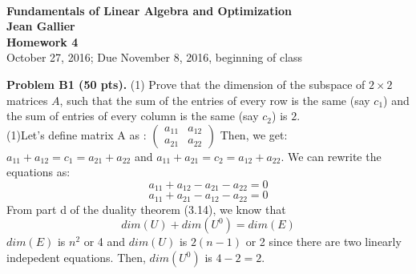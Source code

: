 \documentclass[12pt]{article}
\begin{document}
\begin{center}
\\
\vspace{1cm}
{\Large\bf Fundamentals of Linear Algebra and Optimization\\
Jean Gallier \\
\vspace{0.5cm}
Homework 4}\\[10pt]
October 27, 2016; Due November 8, 2016, beginning of class\\
\end{center}


\vspace {0.25cm}\noindent
{\bf Problem B1 (50 pts).}
(1)
Prove that the dimension of the subspace of $2\times 2$ matrices
$A$, such that the sum of the entries of every row is the same (say $c_1$)
and the sum of entries of every column is the same (say $c_2$) is $2$.\\
(1)Let's define matrix A as : $\begin{pmatrix}
a_{11} & a_{12} \\a_{21} & a_{22}
\end{pmatrix}$ Then, we get: $a_{11} + a_{12} = c_1 = a_{21} + a_{22}$ and $a_{11} + a_{21} = c_2 = a_{12} + a_{22}$. We can rewrite the equations as:
\begin{equation}
a_{11} + a_{12} - a_{21} -a_{22} = 0
\end{equation}
\begin{equation}
a_{11} + a_{21} - a_{12} - a_{22} = 0
\end{equation}
From part d of the duality theorem (3.14), we know that $$dim(U) + dim(U^0) = dim(E)$$
$dim(E)$ is $n^2$ or 4 and $dim(U)$ is $2(n-1)$ or 2 since there are two linearly indepedent equations. Then, $dim(U^0)$ is $4 - 2 = 2$.  
\end{document}
